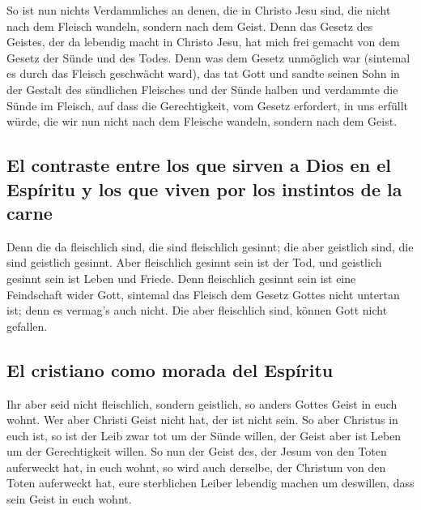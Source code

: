  So ist nun nichts Verdammliches an denen, die in Christo
Jesu sind, die nicht nach dem Fleisch wandeln, sondern nach dem Geist.
 Denn das Gesetz des Geistes, der da lebendig macht in
Christo Jesu, hat mich frei gemacht von dem Gesetz der Sünde und des
Todes.  Denn was dem Gesetz unmöglich war (sintemal es
durch das Fleisch geschwächt ward), das tat Gott und sandte seinen Sohn
in der Gestalt des sündlichen Fleisches und der Sünde halben und
verdammte die Sünde im Fleisch,  auf dass die
Gerechtigkeit, vom Gesetz erfordert, in uns erfüllt würde, die wir nun
nicht nach dem Fleische wandeln, sondern nach dem Geist.

\hypertarget{el-contraste-entre-los-que-sirven-a-dios-en-el-espuxedritu-y-los-que-viven-por-los-instintos-de-la-carne}{%
\subsection{El contraste entre los que sirven a Dios en el Espíritu y
los que viven por los instintos de la
carne}\label{el-contraste-entre-los-que-sirven-a-dios-en-el-espuxedritu-y-los-que-viven-por-los-instintos-de-la-carne}}

 Denn die da fleischlich sind, die sind fleischlich
gesinnt; die aber geistlich sind, die sind geistlich gesinnt.
 Aber fleischlich gesinnt sein ist der Tod, und geistlich
gesinnt sein ist Leben und Friede.  Denn fleischlich
gesinnt sein ist eine Feindschaft wider Gott, sintemal das Fleisch dem
Gesetz Gottes nicht untertan ist; denn es vermag's auch nicht.
 Die aber fleischlich sind, können Gott nicht gefallen.

\hypertarget{el-cristiano-como-morada-del-espuxedritu}{%
\subsection{El cristiano como morada del
Espíritu}\label{el-cristiano-como-morada-del-espuxedritu}}

 Ihr aber seid nicht fleischlich, sondern geistlich, so
anders Gottes Geist in euch wohnt. Wer aber Christi Geist nicht hat, der
ist nicht sein.  So aber Christus in euch ist, so ist der
Leib zwar tot um der Sünde willen, der Geist aber ist Leben um der
Gerechtigkeit willen.  So nun der Geist des, der Jesum
von den Toten auferweckt hat, in euch wohnt, so wird auch derselbe, der
Christum von den Toten auferweckt hat, eure sterblichen Leiber lebendig
machen um deswillen, dass sein Geist in euch wohnt.


